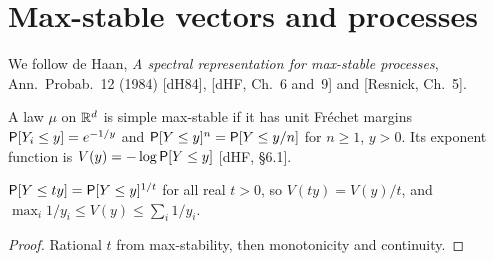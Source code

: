 \chapter{Max-stable vectors and processes}
\label{chap:max-stable}

We follow de Haan, \emph{A spectral representation for max-stable processes}, Ann.\ Probab.\ 12
(1984) [dH84], [dHF, Ch.~6 and~9] and [Resnick, Ch.~5].

\begin{definition}
  \label{def:simple-max-stable}
  \leanok
  A law $\mu$ on $\mathbb{R}^d$ is simple max-stable if it has unit Fr\'echet margins
  $\mathsf{P}[Y_i \le y] = e^{-1/y}$ and $\mathsf{P}[Y \le y]^n = \mathsf{P}[Y \le y/n]$ for $n \ge 1$, $y > 0$. Its exponent
  function is $V(y) = -\log \mathsf{P}[Y \le y]$ [dHF, \S6.1].
\end{definition}

\begin{theorem}
  \label{thm:max-stable-exponent}
  \leanok
  $\mathsf{P}[Y \le ty] = \mathsf{P}[Y \le y]^{1/t}$ for all real $t > 0$, so $V(ty) = V(y)/t$, and
  $\max_i 1/y_i \le V(y) \le \sum_i 1/y_i$.
\end{theorem}
\begin{proof}
  \leanok
  Rational $t$ from max-stability, then monotonicity and continuity.
\end{proof}

